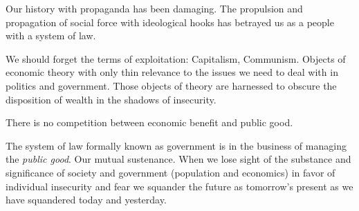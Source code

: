 

Our history with propaganda has been damaging.  The propulsion and
propagation of social force with ideological hooks has betrayed us as
a people with a system of law.

We should forget the terms of exploitation: Capitalism, Communism.
Objects of economic theory with only thin relevance to the issues we
need to deal with in politics and government.  Those objects of theory
are harnessed to obscure the disposition of wealth in the shadows of
insecurity.

There is no competition between economic benefit and public good.

The system of law formally known as government is in the business of
managing the {\it public good}.  Our mutual sustenance.  When we lose
sight of the substance and significance of society and government
(population and economics) in favor of individual insecurity and fear
we squander the future as tomorrow's present as we have squandered
today and yesterday.  

\bye
